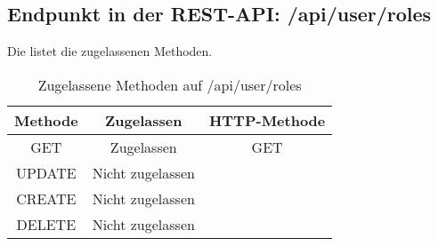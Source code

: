 \subsection{Endpunkt in der REST-API: /api/user/roles}
Die  listet die zugelassenen Methoden. 

\begin{table}[!htbp]
	\begin{tabular}{|c|c|c|}
		\hline
			\textbf{Methode} & \textbf{Zugelassen} & \textbf{HTTP-Methode} \\ \hline
			GET & Zugelassen & GET \\ \hline
			UPDATE & Nicht zugelassen & \\ \hline 
			CREATE & Nicht zugelassen & \\ \hline 
			DELETE & Nicht zugelassen & \\ \hline
	\end{tabular}

		\caption{Zugelassene Methoden auf /api/user/roles}
		\label{tab:end:rest:api:user:roles:meth}
\end{table}